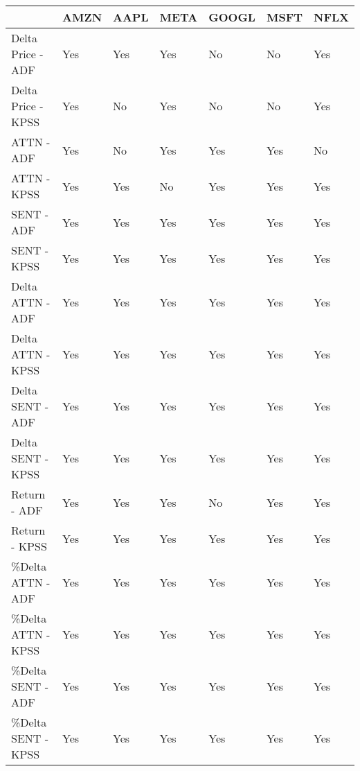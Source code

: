 \begin{tabular}{lllllll}
\toprule
{} & AMZN & AAPL & META & GOOGL & MSFT & NFLX \\
\midrule
Delta Price - ADF  &  Yes &  Yes &  Yes &    No &   No &  Yes \\
Delta Price - KPSS &  Yes &   No &  Yes &    No &   No &  Yes \\
ATTN - ADF         &  Yes &   No &  Yes &   Yes &  Yes &   No \\
ATTN - KPSS        &  Yes &  Yes &   No &   Yes &  Yes &  Yes \\
SENT - ADF         &  Yes &  Yes &  Yes &   Yes &  Yes &  Yes \\
SENT - KPSS        &  Yes &  Yes &  Yes &   Yes &  Yes &  Yes \\
Delta ATTN - ADF   &  Yes &  Yes &  Yes &   Yes &  Yes &  Yes \\
Delta ATTN - KPSS  &  Yes &  Yes &  Yes &   Yes &  Yes &  Yes \\
Delta SENT - ADF   &  Yes &  Yes &  Yes &   Yes &  Yes &  Yes \\
Delta SENT - KPSS  &  Yes &  Yes &  Yes &   Yes &  Yes &  Yes \\
Return - ADF       &  Yes &  Yes &  Yes &    No &  Yes &  Yes \\
Return - KPSS      &  Yes &  Yes &  Yes &   Yes &  Yes &  Yes \\
\%Delta ATTN - ADF  &  Yes &  Yes &  Yes &   Yes &  Yes &  Yes \\
\%Delta ATTN - KPSS &  Yes &  Yes &  Yes &   Yes &  Yes &  Yes \\
\%Delta SENT - ADF  &  Yes &  Yes &  Yes &   Yes &  Yes &  Yes \\
\%Delta SENT - KPSS &  Yes &  Yes &  Yes &   Yes &  Yes &  Yes \\
\bottomrule
\end{tabular}
